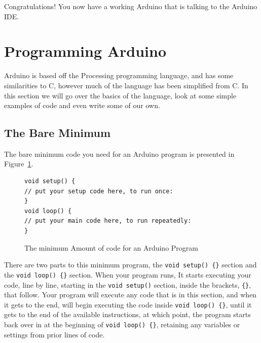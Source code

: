 \documentclass[11pt,a4paper]{article}
\begin{document}


Congratulations!  You now have a working Arduino that is talking to the Arduino IDE.



\section{Programming Arduino} %
\label{sec:programming_arduino}

Arduino is based off the Processing\cite{processing} programming language, and has some similarities to C, however much of the language has been simplified from C.  In this section we will go over the basics of the language, look at some simple examples of code and even write some of our own.

\subsection{The Bare Minimum} %
\label{sub:the_bare_minimum}

The bare minimum code you need for an Arduino program is presented in Figure~\ref{fig:bare}.

\begin{figure}[htbp]
	\centering
\begin{verbatim}
void setup() {
// put your setup code here, to run once:
}
void loop() {
// put your main code here, to run repeatedly: 
}
\end{verbatim}
	\caption{The minimum Amount of code for an Arduino Program}
	\label{fig:bare}
\end{figure}

There are two parts to this minimum program, the \texttt{void setup() \{\}} section and the \texttt{void loop() \{\}} section.  When your program runs, It starts executing your code, line by line, starting in the \texttt{void setup()} section, inside the brackets, \texttt{\{\}}, that follow.  Your program will execute any code that is in this section, and when it gets to the end, will begin executing the code inside \texttt{void loop() \{\}}, until it gets to the end of the available instructions, at which point, the program starts back over in at the beginning of \texttt{void loop() \{\}}, retaining any variables or settings from prior lines of code.
\end{document}
